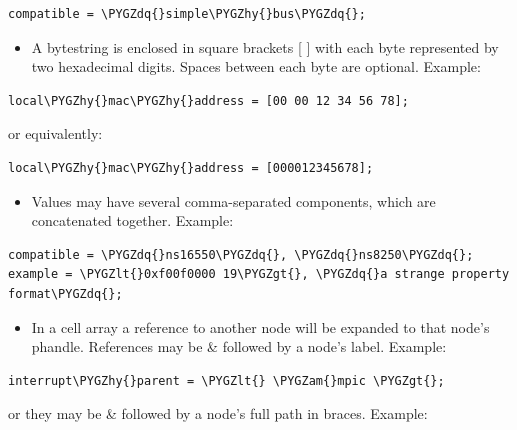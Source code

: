 \documentclass[a4paper,10pt,oneside]{sphinxmanual}
\def\PYGZam{\char`\&}
\def\PYGZlt{\char`\<}
\def\PYGZgt{\char`\>}
\def\PYGZhy{\char`\-}
\def\PYGZdq{\char`\"}
\begin{document}
\begin{Verbatim}[commandchars=\\\{\}]
compatible = \PYGZdq{}simple\PYGZhy{}bus\PYGZdq{};
\end{Verbatim}
\begin{itemize}
\item {} 
A bytestring is enclosed in square brackets {[} {]} with each byte
represented by two hexadecimal digits. Spaces between each byte are
optional. Example:

\end{itemize}

\begin{Verbatim}[commandchars=\\\{\}]
local\PYGZhy{}mac\PYGZhy{}address = [00 00 12 34 56 78];
\end{Verbatim}

or equivalently:

\begin{Verbatim}[commandchars=\\\{\}]
local\PYGZhy{}mac\PYGZhy{}address = [000012345678];
\end{Verbatim}
\begin{itemize}
\item {} 
Values may have several comma-separated components, which are
concatenated together. Example:

\end{itemize}

\begin{Verbatim}[commandchars=\\\{\}]
compatible = \PYGZdq{}ns16550\PYGZdq{}, \PYGZdq{}ns8250\PYGZdq{};
example = \PYGZlt{}0xf00f0000 19\PYGZgt{}, \PYGZdq{}a strange property format\PYGZdq{};
\end{Verbatim}
\begin{itemize}
\item {} 
In a cell array a reference to another node will be expanded to that
node’s phandle. References may be \& followed by a node’s label.
Example:

\end{itemize}

\begin{Verbatim}[commandchars=\\\{\}]
interrupt\PYGZhy{}parent = \PYGZlt{} \PYGZam{}mpic \PYGZgt{};
\end{Verbatim}

or they may be \& followed by a node’s full path in braces. Example:
\end{document}
